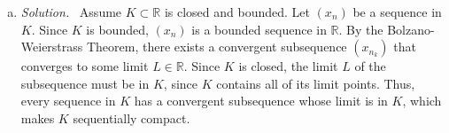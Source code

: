 \documentclass[12pt]{article}
\newcommand{\bbR}{\mathbb{R}}
\renewcommand{\_}[1]{\underline{ #1 }}
\theoremstyle{definition}
\newenvironment{exercise}[1]
  {\renewcommand\theinnercustomthm{#1}\innercustomthm}
  {\endinnercustomthm}
\newenvironment{solution}{\par\noindent\textit{Solution.}\ }{\par}
\numberwithin{equation}{subsection}
\begin{document}
\begin{exercise}{11}
\begin{enumerate} [(a)]
\begin{solution}
        \end{solution}
        \item \begin{solution}
            Assume $K \subset \bbR$ is closed and bounded. Let $(x_n)$ be a sequence in $K$. Since $K$ is bounded, $(x_n)$ is a bounded sequence in $\bbR$. By the Bolzano-Weierstrass Theorem, there exists a convergent subsequence $(x_{n_k})$ that converges to some limit $L \in \bbR$. Since $K$ is closed, the limit $L$ of the subsequence must be in $K$, since $K$ contains all of its limit points. Thus, every sequence in $K$ has a convergent subsequence whose limit is in $K$, which makes $K$ sequentially compact. 
        \end{solution}
    \end{enumerate}
\end{exercise}
\end{document}
